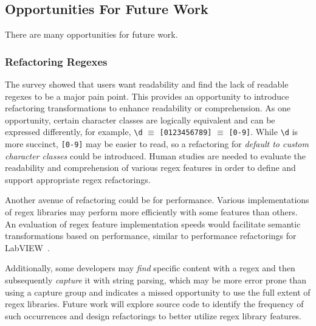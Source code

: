 \subsection{Opportunities For Future Work}

There are many opportunities for future work. %




\subsubsection{Refactoring Regexes}
The survey showed that users want readability and find the lack of readable regexes to be a major pain point.
This provides an opportunity to introduce refactoring transformations to enhance readability or comprehension.
As one opportunity, certain character classes are logically equivalent and can be expressed differently, for example, \verb!\d! $\equiv$ \verb![0123456789]! $\equiv$ \verb![0-9]!. While \verb!\d! is more succinct, \verb![0-9]! may be easier to read, so a refactoring for \emph{default to custom character classes} could be introduced.
Human studies are needed to evaluate the readability and comprehension of various regex features in order to define and support appropriate regex refactorings.

Another avenue of refactoring could be for performance. Various implementations of regex libraries may perform more efficiently with some features than others. An evaluation of regex feature implementation speeds would facilitate semantic transformations based on performance, similar to performance refactorings for LabVIEW~\cite{chambers2013smell, chambers2015impact}.


Additionally, some developers may  \emph{find} specific content with a regex  and then subsequently \emph{capture} it with string parsing, which may be more error prone than using a capture group and indicates a missed opportunity to use the full extent of regex libraries. Future work will explore source code to identify the frequency of such occurrences and design refactorings to better utilize regex library features.


